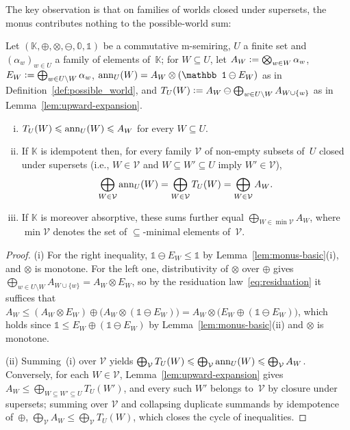 \begin{toappendix}
The key observation is that on families of worlds closed under
supersets, the monus contributes nothing to the possible-world sum:
\begin{proposition}\label{prop:monus-cancellation}
  Let $(\mathbb K,\oplus,\otimes,\ominus,\mathbb 0,\mathbb 1)$ be a
  commutative m-semiring, $U$ a finite set and $(\alpha_w)_{w\in U}$ a
  family of elements of~$\mathbb K$; for $W\subseteq U$, let
  $A_W\mathrel{\mathop:}=\bigotimes_{w\in W}\alpha_w$,
  $E_W\mathrel{\mathop:}=\bigoplus_{w\in U\setminus W}\alpha_w$,
  $\ann_U(W)=A_W\otimes(\mathbb 1\ominus E_W)$ as in
  Definition~\ref{def:possible_world}, and
  $T_U(W)\mathrel{\mathop:}= A_W\ominus\bigoplus_{w\in U\setminus W}A_{W\cup\{w\}}$
  as in Lemma~\ref{lem:upward-expansion}.
  \begin{enumerate}[(i)]
    \item
      $T_U(W)\leqslant\mathrm{ann}_U(W)\leqslant A_W$ for every $W\subseteq U$.
    \item
      If $\mathbb K$ is idempotent then, for every family
      $\mathcal V$ of non-empty subsets of~$U$ closed under supersets
      (i.e., $W\in\mathcal V$ and $W\subseteq W'\subseteq U$ imply
      $W'\in\mathcal V$),
      \[
        \bigoplus_{W\in\mathcal V}\mathrm{ann}_U(W)
        =\bigoplus_{W\in\mathcal V}T_U(W)
        =\bigoplus_{W\in\mathcal V}A_W.
      \]
    \item
      If $\mathbb K$ is moreover absorptive, these sums further
      equal $\bigoplus_{W\in\min\mathcal V}A_W$, where
      $\min\mathcal V$ denotes the set of $\subseteq$-minimal elements
      of~$\mathcal V$.
  \end{enumerate}
\end{proposition}
\begin{proof}
  (i) For the right inequality, $\mathbb 1\ominus E_W\le\mathbb 1$ by
  Lemma~\ref{lem:monus-basic}(i), and $\otimes$ is monotone. For the
  left one, distributivity of $\otimes$ over $\oplus$ gives
  $\bigoplus_{w\in U\setminus W}A_{W\cup\{w\}}=A_W\otimes E_W$, so by
  the residuation law~\eqref{eq:residuation} it suffices that
  $A_W\le(A_W\otimes E_W)\oplus\bigl(A_W\otimes(\mathbb 1\ominus
  E_W)\bigr)=A_W\otimes\bigl(E_W\oplus(\mathbb 1\ominus E_W)\bigr)$,
  which holds since $\mathbb 1\le E_W\oplus(\mathbb 1\ominus E_W)$ by
  Lemma~\ref{lem:monus-basic}(ii) and $\otimes$ is monotone.

  (ii) Summing~(i) over $\mathcal V$ yields
  $\bigoplus_{\mathcal V}T_U(W)\leqslant\bigoplus_{\mathcal V}\mathrm{ann}_U(W)
  \leqslant\bigoplus_{\mathcal V}A_W$. Conversely, for each
  $W\in\mathcal V$, Lemma~\ref{lem:upward-expansion} gives
  $A_W\le\bigoplus_{W\subseteq W'\subseteq U}T_U(W')$, and every such
  $W'$ belongs to~$\mathcal V$ by closure under supersets; summing
  over $\mathcal V$ and collapsing duplicate summands by idempotence
  of~$\oplus$,
  $\bigoplus_{\mathcal V}A_W\le\bigoplus_{\mathcal V}T_U(W)$, which
  closes the cycle of inequalities.


\end{proof}
\end{toappendix}
